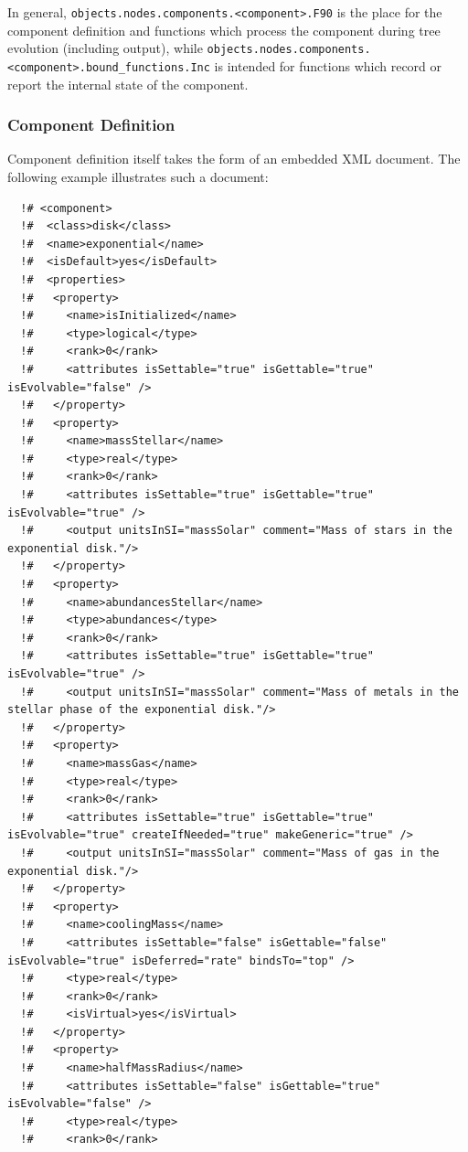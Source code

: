 In general, {\tt objects.nodes.components.\textless component\textgreater.F90} is the place for the component definition and functions which process the component during tree evolution (including output), while {\tt objects.nodes.components.\textless component\textgreater.bound\_functions.Inc} is intended for functions which record or report the internal state of the component.

\subsubsection{Component Definition}\label{sec:ComponentDefinition}

Component definition itself takes the form of an embedded XML document. The following example illustrates such a document:
\begin{verbatim}
  !# <component>
  !#  <class>disk</class>
  !#  <name>exponential</name>
  !#  <isDefault>yes</isDefault>
  !#  <properties>
  !#   <property>
  !#     <name>isInitialized</name>
  !#     <type>logical</type>
  !#     <rank>0</rank>
  !#     <attributes isSettable="true" isGettable="true" isEvolvable="false" />
  !#   </property>
  !#   <property>
  !#     <name>massStellar</name>
  !#     <type>real</type>
  !#     <rank>0</rank>
  !#     <attributes isSettable="true" isGettable="true" isEvolvable="true" />
  !#     <output unitsInSI="massSolar" comment="Mass of stars in the exponential disk."/>
  !#   </property>
  !#   <property>
  !#     <name>abundancesStellar</name>
  !#     <type>abundances</type>
  !#     <rank>0</rank>
  !#     <attributes isSettable="true" isGettable="true" isEvolvable="true" />
  !#     <output unitsInSI="massSolar" comment="Mass of metals in the stellar phase of the exponential disk."/>
  !#   </property>
  !#   <property>
  !#     <name>massGas</name>
  !#     <type>real</type>
  !#     <rank>0</rank>
  !#     <attributes isSettable="true" isGettable="true" isEvolvable="true" createIfNeeded="true" makeGeneric="true" />
  !#     <output unitsInSI="massSolar" comment="Mass of gas in the exponential disk."/>
  !#   </property>
  !#   <property>
  !#     <name>coolingMass</name>
  !#     <attributes isSettable="false" isGettable="false" isEvolvable="true" isDeferred="rate" bindsTo="top" />
  !#     <type>real</type>
  !#     <rank>0</rank>
  !#     <isVirtual>yes</isVirtual>
  !#   </property>
  !#   <property>
  !#     <name>halfMassRadius</name>
  !#     <attributes isSettable="false" isGettable="true" isEvolvable="false" />
  !#     <type>real</type>
  !#     <rank>0</rank>

\end{verbatim}
